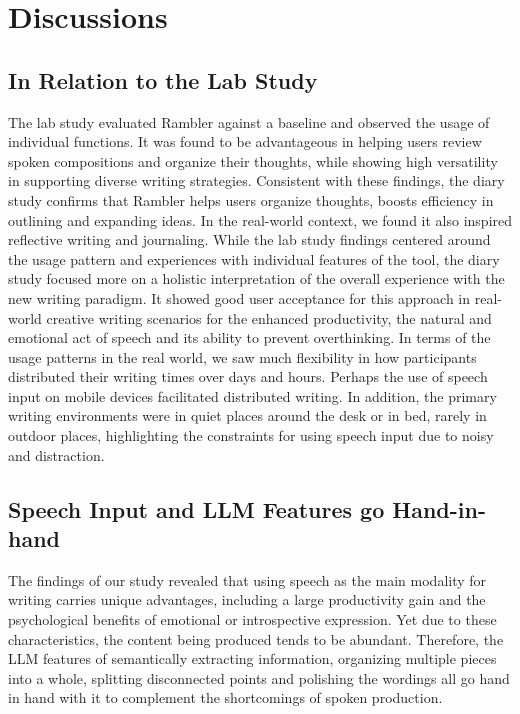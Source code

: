 \section{Discussions}
\subsection{In Relation to the Lab Study}
The lab study evaluated Rambler against a baseline and observed the usage of individual functions. It was found to be advantageous in helping users review spoken compositions and organize their thoughts, while showing high versatility in supporting diverse writing strategies.
Consistent with these findings, the diary study confirms that Rambler helps users organize thoughts, boosts efficiency in outlining and expanding ideas. In the real-world context, we found it also inspired reflective writing and journaling. While the lab study findings centered around the usage pattern and experiences with individual features of the tool, the diary study focused more on a holistic interpretation of the overall experience with the new writing paradigm. It showed good user acceptance for this approach in real-world creative writing scenarios for the enhanced productivity, the natural and emotional act of speech and its ability to prevent overthinking.
In terms of the usage patterns in the real world, we saw much flexibility in how participants distributed their writing times over days and hours. Perhaps the use of speech input on mobile devices facilitated distributed writing. In addition, the primary writing environments were in quiet places around the desk or in bed, rarely in outdoor places, highlighting the constraints for using speech input due to noisy and distraction.

\subsection{Speech Input and LLM Features go Hand-in-hand}
The findings of our study revealed that using speech as the main modality for writing carries unique advantages, including a large productivity gain and the psychological benefits of emotional or introspective expression. Yet due to these characteristics, the content being produced tends to be abundant. Therefore, the LLM features of semantically extracting information, organizing multiple pieces into a whole, splitting disconnected points and polishing the wordings all go hand in hand with it to complement the shortcomings of spoken production. 

